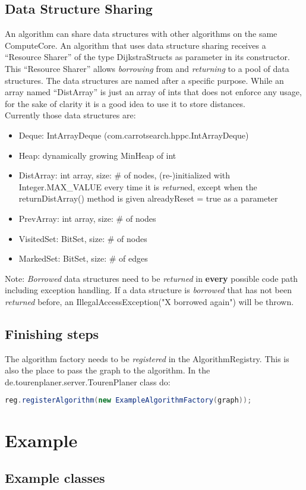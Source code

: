 \documentclass[ngerman,titlepage,parskip=true]{scrartcl}
\begin{document}
  \label{sharing}
  \subsection{Data Structure Sharing}
  An algorithm can share data structures with other algorithms on the same ComputeCore. An algorithm that uses data structure sharing receives a ``Resource Sharer'' of the type DijkstraStructs as parameter in its constructor. This ``Resource Sharer'' allows \textit{borrowing} from and \textit{returning} to a pool of data structures. The data structures are named after a specific purpose. While an array named ``DistArray'' is just an array of ints that does not enforce any usage, for the sake of clarity it is a good idea to use it to store distances.\\
  Currently those data structures are:
  \begin{itemize}
    \item Deque: IntArrayDeque (com.carrotsearch.hppc.IntArrayDeque)
    \item Heap: dynamically growing MinHeap of int
    \item DistArray: int array, size: \# of nodes, (re-)initialized with Integer.MAX\_VALUE every time it is \textit{return}ed, except when the returnDistArray() method is given alreadyReset = true as a parameter
    \item PrevArray: int array, size: \# of nodes
    \item VisitedSet: BitSet, size: \# of nodes
    \item MarkedSet: BitSet, size: \# of edges
  \end{itemize}
  Note: \textit{Borrowed} data structures need to be \textit{returned} in \textbf{every} possible code path including exception handling. If a data structure is \textit{borrowed} that has not been \textit{returned} before, an IllegalAccessException("X borrowed again") will be thrown.

  \subsection{Finishing steps}
  The algorithm factory needs to be \textit{registered} in the AlgorithmRegistry. This is also the place to pass the graph to the algorithm.
  In the de.tourenplaner.server.TourenPlaner class do:
  \begin{lstlisting}[language=java,caption=register your algorithm factory]
          reg.registerAlgorithm(new ExampleAlgorithmFactory(graph));
  \end{lstlisting}
  
  \section{Example}
	 \subsection{Example classes}
	 
	 
\end{document}
